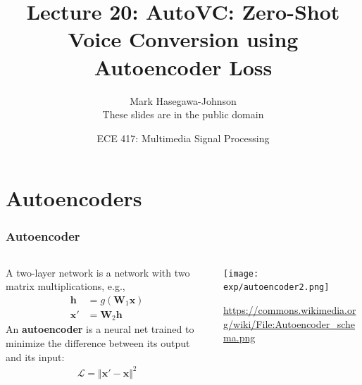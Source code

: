 \documentclass{beamer}
\title{Lecture 20: AutoVC: Zero-Shot Voice Conversion using Autoencoder Loss}
\author{Mark Hasegawa-Johnson\\These slides are in the public domain}
\date{ECE 417: Multimedia Signal Processing}
\institute{University of Illinois}
\begin{document}
\begin{frame}
  \maketitle
\end{frame}

\begin{frame}
  \tableofcontents
\end{frame}


\section{Autoencoders}
\setcounter{subsection}{1}

\begin{frame}
  \frametitle{Autoencoder}
  \begin{columns}
    \begin{column}{0.5\textwidth}
      A two-layer network is a network with two matrix
      multiplications, e.g.,
      \begin{align*}
        \bm{h}&=g\left(\bm{W}_1\bm{x}\right)\\
        \bm{x'}&=\bm{W}_2\bm{h}
      \end{align*}
      An \textbf{autoencoder} is a neural net trained to minimize the
      difference between its output and its input:
      \begin{align*}
        \mathcal{L}=\Vert\bm{x'}-\bm{x}\Vert^2
      \end{align*}
    \end{column}
    \begin{column}{0.5\textwidth}
      \texttt{[image: exp/autoencoder2.png]}

      \url{https://commons.wikimedia.org/wiki/File:Autoencoder_schema.png}
    \end{column}
  \end{columns}
\end{frame}
\end{document}
